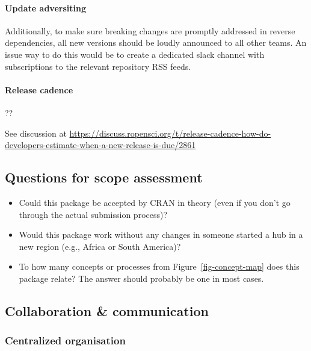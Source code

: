 \documentclass[
  letterpaper,
  DIV=11,
  numbers=noendperiod]{scrartcl}
\providecommand{\tightlist}{%
  \setlength{\itemsep}{0pt}\setlength{\parskip}{0pt}}
\begin{document}
\hypertarget{sec-advertising}{%
\paragraph{Update adversiting}\label{sec-advertising}}

Additionally, to make sure breaking changes are promptly addressed in
reverse dependencies, all new versions should be loudly announced to all
other teams. An issue way to do this would be to create a dedicated
slack channel with subscriptions to the relevant repository RSS feeds.

\hypertarget{release-cadence}{%
\paragraph{Release cadence}\label{release-cadence}}

??

See discussion at
\url{https://discuss.ropensci.org/t/release-cadence-how-do-developers-estimate-when-a-new-release-is-due/2861}

\hypertarget{questions-for-scope-assessment}{%
\subsection{Questions for scope
assessment}\label{questions-for-scope-assessment}}

\begin{itemize}
\tightlist
\item
  Could this package be accepted by CRAN in theory (even if you don't go
  through the actual submission process)?
\item
  Would this package work without any changes in someone started a hub
  in a new region (e.g., Africa or South America)?
\item
  To how many concepts or processes from Figure~\ref{fig-concept-map}
  does this package relate? The answer should probably be one in most
  cases.
\end{itemize}

\hypertarget{collaboration-communication}{%
\subsection{Collaboration \&
communication}\label{collaboration-communication}}

\hypertarget{centralized-organisation}{%
\subsubsection{Centralized
organisation}\label{centralized-organisation}}
\end{document}
